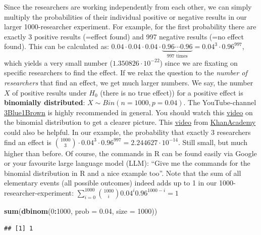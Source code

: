 \documentclass[
]{book}
\newenvironment{Shaded}{\begin{snugshade}}{\end{snugshade}}
\newcommand{\AttributeTok}[1]{\textcolor[rgb]{0.13,0.29,0.53}{#1}}
\newcommand{\DecValTok}[1]{\textcolor[rgb]{0.00,0.00,0.81}{#1}}
\newcommand{\FloatTok}[1]{\textcolor[rgb]{0.00,0.00,0.81}{#1}}
\newcommand{\FunctionTok}[1]{\textcolor[rgb]{0.13,0.29,0.53}{\textbf{#1}}}
\newcommand{\NormalTok}[1]{#1}
\newcommand{\SpecialCharTok}[1]{\textcolor[rgb]{0.81,0.36,0.00}{\textbf{#1}}}
\begin{document}
Since the researchers are working independently from each other, we can simply multiply the probabilities of their individual positive or negative results in
our larger 1000-researcher experiment. For example, for the first probability there are exactly 3 positive results (=effect found) and 997 negative results (=no effect found).
This can be calculated as:
\(0.04 \cdot 0.04 \cdot 0.04 \cdot \underbrace{0.96 \cdots 0.96}_{\text{997 times}} = 0.04^3 \cdot 0.96^{997}\), which yields a very small number (\(1.350826 \cdot 10^{-22}\))
since we are fixating on specific researchers to find the effect.
If we relax the question to the \emph{number of researchers} that find an effect,
we get much larger numbers. We say, the number \(X\) of positive results under \(H_0\) (there is no true effect)) for a positive effect is \textbf{binomially distributed}: \(X \sim Bin(n=1000, p=0.04)\).
The YouTube-channel \href{https://www.youtube.com/@3blue1brown}{3Blue1Brown} is highly recommended in general. You should watch this
\href{https://www.youtube.com/watch?v=8idr1WZ1A7Q&ab_channel=3Blue1Brown}{video} on the binomial distribution to get a clearer picture.
This \href{https://www.youtube.com/watch?v=WWv0RUxDfbs&ab_channel=KhanAcademy}{video} from \href{https://www.youtube.com/@khanacademy}{KhanAcademy} could also be helpful.
In our example, the probability that exactly 3 researchers find an effect is \(\binom{1000}{3} \cdot 0.04^3 \cdot 0.96^{997} = 2.244627 \cdot 10^{-14}\).
Still small, but much higher than before. Of course, the commands in R can be found easily via Google or your favourite large language model (LLM):
``Give me the commands for the binomial distribution in R and a nice example too''.
Note that the sum of all elementary events (all possible outcomes) indeed adds up to 1 in our 1000-researcher-experiment: \(\sum_{i=0}^{1000} \binom{1000}{i}0.04^i 0.96^{1000-i} = 1\)

\begin{Shaded}
\begin{Highlighting}[]
\FunctionTok{sum}\NormalTok{(}\FunctionTok{dbinom}\NormalTok{(}\DecValTok{0}\SpecialCharTok{:}\DecValTok{1000}\NormalTok{, }\AttributeTok{prob =} \FloatTok{0.04}\NormalTok{, }\AttributeTok{size =} \DecValTok{1000}\NormalTok{))}
\end{Highlighting}
\end{Shaded}

\begin{verbatim}
## [1] 1
\end{verbatim}
\end{document}
